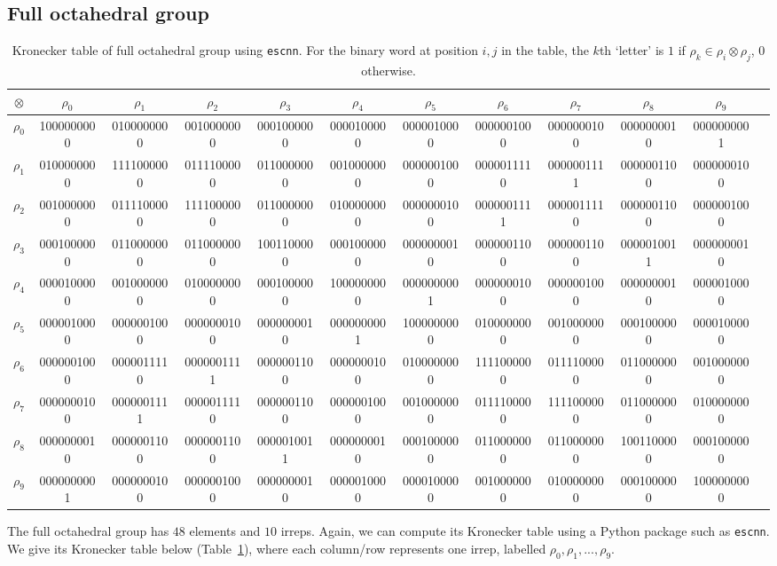 \documentclass{article}
\theoremstyle{plain}
\theoremstyle{definition}
\theoremstyle{remark}
\newcommand{\minuscule}{\fontsize{5}{6}\selectfont}
\begin{document}
\subsection{Full octahedral group}
\begin{table}[h]
    \centering
    \minuscule
    \begin{tabular}{|c||c|c|c|c|c|c|c|c|c|c|c|}
    \hline
            $\otimes$ &$\rho_0$&$\rho_1$&$\rho_2$&$\rho_3$&$\rho_4$&$\rho_5$&$\rho_6$&$\rho_7$&$\rho_8$&$\rho_9$\\
    \hline
    $\rho_0$&1000000000 & 0100000000 & 0010000000 & 0001000000 & 0000100000 & 0000010000 & 0000001000 & 0000000100 & 0000000010 & 0000000001 \\
    \hline
    $\rho_1$&0100000000 & 1111000000 & 0111100000 & 0110000000 & 0010000000 & 0000001000 & 0000011110 & 0000001111 & 0000001100 & 0000000100 \\
    \hline
    $\rho_2$&0010000000 & 0111100000 & 1111000000 & 0110000000 & 0100000000 & 0000000100 & 0000001111 & 0000011110 & 0000001100 & 0000001000 \\
    \hline
    $\rho_3$&0001000000 & 0110000000 & 0110000000 & 1001100000 & 0001000000 & 0000000010 & 0000001100 & 0000001100 & 0000010011 & 0000000010 \\
    \hline
    $\rho_4$&0000100000 & 0010000000 & 0100000000 & 0001000000 & 1000000000 & 0000000001 & 0000000100 & 0000001000 & 0000000010 & 0000010000 \\
    \hline
    $\rho_5$&0000010000 & 0000001000 & 0000000100 & 0000000010 & 0000000001 & 1000000000 & 0100000000 & 0010000000 & 0001000000 & 0000100000 \\
    \hline
    $\rho_6$&0000001000 & 0000011110 & 0000001111 & 0000001100 & 0000000100 & 0100000000 & 1111000000 & 0111100000 & 0110000000 & 0010000000 \\
    \hline
    $\rho_7$&0000000100 & 0000001111 & 0000011110 & 0000001100 & 0000001000 & 0010000000 & 0111100000 & 1111000000 & 0110000000 & 0100000000 \\
    \hline
    $\rho_8$&0000000010 & 0000001100 & 0000001100 & 0000010011 & 0000000010 & 0001000000 & 0110000000 & 0110000000 & 1001100000 & 0001000000 \\
    \hline
    $\rho_9$&0000000001 & 0000000100 & 0000001000 & 0000000010 & 0000010000 & 0000100000 & 0010000000 & 0100000000 & 0001000000 & 1000000000\\
    \hline
    \end{tabular}
    \caption{Kronecker table of  full octahedral group using \texttt{escnn}. For the binary word at position $i,j$ in the table, the $k$th `letter' is $1$ if $\rho_k\in\rho_i\otimes \rho_j$, $0$ otherwise.}
    \label{tab:full_octa}
\end{table}
The full octahedral group has $48$ elements and $10$ irreps. Again, we can compute its Kronecker table using a Python package such as \texttt{escnn}. We give its Kronecker table below (Table~\ref{tab:full_octa}), where each column/row represents one irrep, labelled $\rho_0, \rho_1, ..., \rho_{9}$.
\end{document}
